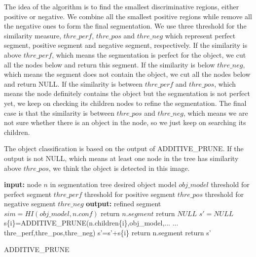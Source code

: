 \documentclass[10pt,twocolumn,letterpaper]{article}
\begin{document}
The idea of the algorithm is to find the smallest discriminative
regions, either positive or negative. We combine all the smallest
positive regions while remove all the negative ones to form the
final segmentation. We use three threshold for the similarity
measure, $thre\_perf$, $thre\_pos$ and $thre\_neg$ which represent
perfect segment, positive segment and negative segment,
respectively. If the similarity is above $thre\_perf$, which means
the segmentation is perfect for the object, we cut all the nodes
below and return this segment. If the similarity is below
$thre\_neg$, which means the segment does not contain the object, we
cut all the nodes below and return NULL. If the similarity is
between $thre\_perf$ and $thre\_pos$, which means the node
definitely contains the object but the segmentation is not perfect
yet, we keep on checking its children nodes to refine the
segmentation. The final case is that the similarity is between
$thre\_pos$ and $thre\_neg$, which means we are not sure whether
there is an object in the node, so we just keep on searching its
children.

The object classification is based on the output of ADDITIVE\_PRUNE. If the output is not NULL, which means at least one node in the tree has similarity above $thre\_pos$, we think the object is detected in this image.


\begin{algorithm}
\begin{algorithmic}
  \STATE \textbf{input:}
  \STATE \hspace{3 mm} node $n$ in segmentation tree
  \STATE \hspace{3 mm} desired object model $obj\_model$
  \STATE \hspace{3 mm} threshold for perfect segment $thre\_perf$
  \STATE \hspace{3 mm} threshold for positive segment $thre\_pos$
  \STATE \hspace{3 mm} threshold for negative segment $thre\_neg$
  \STATE \textbf{output:}
  \STATE \hspace{3 mm} refined segment
  \STATE
  \STATE $sim=HI(obj\_model,n.conf)$
    \STATE return $n.segment$
  \ENDIF
    \STATE return $NULL$
  \ENDIF
  \STATE $s'=NULL$
    \STATE s\{i\}=ADDITIVE\_PRUNE(n.children\{i\},obj\_model,...
    \STATE ... thre\_perf,thre\_pos,thre\_neg)
    \STATE s'=s'+s\{i\}
  \ENDFOR
    \STATE return n.segment
  \ELSE
    \STATE return s'
  \ENDIF
\end{algorithmic}
\caption{ADDITIVE\_PRUNE}
\label{alg:add_prune}
\end{algorithm}
\end{document}
